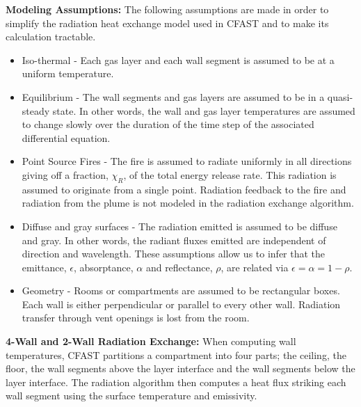 { \bf Modeling Assumptions:}  The following assumptions are made in order to simplify the radiation heat exchange model used in CFAST and to make its calculation tractable.

\begin{itemize}
\item Iso-thermal - Each gas layer and each wall segment is assumed to be at a uniform temperature.

\item Equilibrium - The wall segments and gas layers are assumed to be in a quasi-steady state.  In other words, the wall and gas layer temperatures are assumed to change slowly over the duration of the time step of the associated differential equation.

\item Point Source Fires - The fire is assumed to radiate uniformly in all directions giving off a fraction, $\chi_R$, of the total energy release rate.  This radiation is assumed to originate from a single point.  Radiation feedback to the fire and radiation from the plume is not modeled in the radiation exchange algorithm.

\item Diffuse and gray surfaces - The radiation emitted is assumed to be diffuse and gray.  In other words, the radiant fluxes emitted are independent of direction and wavelength.  These assumptions allow us to infer that the emittance, $\epsilon$, absorptance, $\alpha$ and reflectance, $\rho$, are related via $\epsilon = \alpha = 1 - \rho$.

\item Geometry - Rooms or compartments are assumed to be rectangular boxes.  Each wall is either perpendicular or parallel to every other wall.  Radiation transfer through vent openings is lost from the room.
\end{itemize}

{\bf 4-Wall and 2-Wall Radiation Exchange:} When computing wall temperatures, CFAST partitions a compartment into four parts; the ceiling, the floor, the wall segments above the layer interface and the wall segments below the layer interface.  The radiation algorithm then computes a heat flux striking each wall segment using the surface temperature and emissivity.

